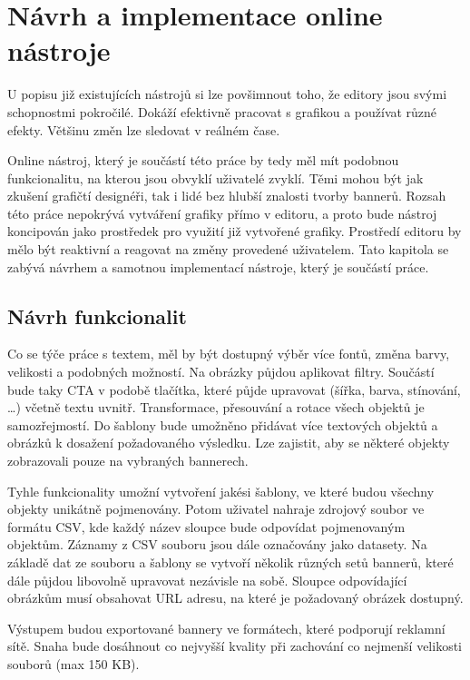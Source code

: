 \chapter{Návrh a implementace online nástroje}
\label{chap:design}
U popisu již existujících nástrojů si lze povšimnout toho, že editory jsou svými schopnostmi pokročilé.
Dokáží efektivně pracovat s grafikou a používat různé efekty. Většinu změn lze sledovat v reálném čase. 

Online nástroj, který je součástí této práce by tedy měl mít podobnou funkcionalitu, na kterou jsou obvyklí uživatelé zvyklí.
Těmi mohou být jak zkušení grafičtí designéři, tak i lidé bez hlubší znalosti tvorby bannerů.
Rozsah této práce nepokrývá vytváření grafiky přímo v editoru, a proto bude nástroj koncipován jako prostředek pro využití již vytvořené grafiky.
Prostředí editoru by mělo být reaktivní a reagovat na změny provedené uživatelem. Tato kapitola se zabývá návrhem a samotnou implementací
nástroje, který je součástí práce.

    \section{Návrh funkcionalit}\label{sec:function-design}
    Co se týče práce s textem, měl by být dostupný výběr více fontů, změna barvy, velikosti a podobných možností.
    Na obrázky půjdou aplikovat filtry. Součástí bude taky CTA v podobě tlačítka, které půjde upravovat (šířka, barva, stínování, \ldots) včetně textu uvnitř.
    Transformace, přesouvání a rotace všech objektů je samozřejmostí. Do šablony bude umožněno přidávat více textových objektů a obrázků k
    dosažení požadovaného výsledku. Lze zajistit, aby se některé objekty zobrazovali pouze na vybraných bannerech.

    Tyhle funkcionality umožní vytvoření jakési šablony, ve které budou všechny objekty unikátně pojmenovány.
    Potom uživatel nahraje zdrojový soubor ve formátu CSV, kde každý název sloupce bude odpovídat pojmenovaným objektům.
    Záznamy z CSV souboru jsou dále označovány jako datasety. Na základě dat ze souboru a šablony se vytvoří několik různých setů bannerů,
    které dále půjdou libovolně upravovat nezávisle na sobě. Sloupce odpovídající obrázkům musí obsahovat URL adresu, na které je požadovaný obrázek dostupný.

    Výstupem budou exportované bannery ve formátech, které podporují reklamní sítě.
    Snaha bude dosáhnout co nejvyšší kvality při zachování co nejmenší velikosti souborů (max 150 KB). 

